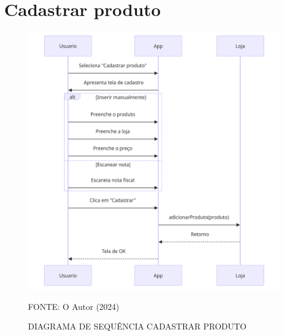\section{Cadastrar produto}
\begin{figure}[H]
    \caption{\label{fig:seqcadprod} DIAGRAMA DE SEQUÊNCIA CADASTRAR PRODUTO}
    \includegraphics[width = 150mm]{fig/sequencia/sequencia4.png}
    \footnotesize \centering
    \par FONTE: O Autor (2024)
\end{figure}










